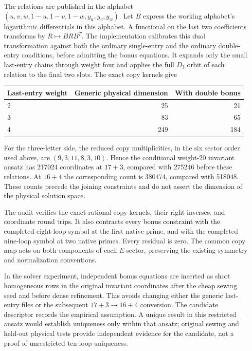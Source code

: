 \documentclass[11pt]{article}
\begin{document}
The relations are published in the alphabet
$(u,v,w,1-u,1-v,1-w,y_u,y_v,y_w)$. Let $B$ express the working alphabet's
logarithmic differentials in this alphabet. A functional on the last two
coefficients transforms by $R\mapsto BRB^T$. The implementation calibrates
this dual transformation against both the ordinary single-entry and the
ordinary double-entry conditions, before admitting the bonus equations.
It expands only the small last-entry chains through weight four and applies
the full $D_3$ orbit of each relation to the final two slots. The exact
copy kernels give
\begin{center}
\begin{tabular}{lrr}\toprule
Last-entry weight & Generic physical dimension & With double bonus\\\midrule
2 & 25 & 21\\
3 & 83 & 65\\
4 & 249 & 184\\\bottomrule
\end{tabular}
\end{center}
For the three-letter side, the reduced copy multiplicities, in the six
sector order used above, are $(9,3,11,8,3,10)$. Hence the conditional
weight-20 invariant ansatz has 217024 coordinates at $17+3$, compared with
275246 before these relations. At $16+4$ the corresponding count is 380474,
compared with 518048. These counts precede the joining constraints and
do not assert the dimension of the physical solution space.

The audit verifies the exact rational copy kernels, their right inverses,
and coordinate round trips. It also contracts every bonus constraint with
the completed eight-loop symbol at the first native prime, and with the
completed nine-loop symbol at two native primes. Every residual is zero.
The common copy map acts on both components of each $E$ sector, preserving
the existing symmetry and normalization conventions.

In the solver experiment, independent bonus equations are inserted as short
homogeneous rows in the original invariant coordinates after the cheap
sewing seed and before dense refinement. This avoids changing either the
generic last-entry files or the subsequent $17+3\to16+4$ conversion. The
candidate descriptor records the empirical assumption. A unique result in
this restricted ansatz would establish uniqueness only within that ansatz;
original sewing and held-out physical tests provide independent evidence
for the candidate, not a proof of unrestricted ten-loop uniqueness.
\end{document}
